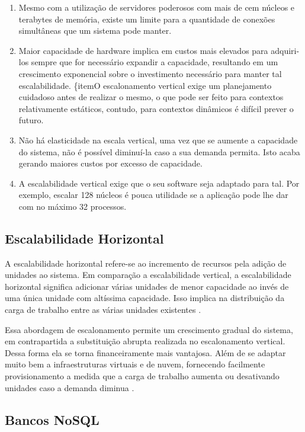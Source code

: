 \begin{enumerate}
    \item{Mesmo com a utilização de servidores poderosos com mais de cem núcleos
    e terabytes de memória, existe um limite para a quantidade de conexões
    simultâneas que um sistema pode manter.}
    \item{Maior capacidade de hardware implica em custos mais elevados para
    adquiri-los sempre que for necessário expandir a capacidade, resultando em
    um crescimento exponencial sobre o investimento necessário para manter tal
    escalabilidade.}
    \{item{O escalonamento vertical exige um planejamento cuidadoso antes de
    realizar o mesmo, o que pode ser feito para contextos relativamente estáticos,
    contudo, para contextos dinâmicos é difícil prever o futuro.}
    \item{Não há elasticidade na escala vertical, uma vez que se aumente a
    capacidade do sistema, não é possível diminuí-la caso a sua demanda permita.
    Isto acaba gerando maiores custos por excesso de capacidade.}
    \item{A escalabilidade vertical exige que o seu software seja adaptado para
    tal. Por exemplo, escalar 128 núcleos é pouca utilidade se a aplicação pode
    lhe dar com no máximo 32 processos.}
\end{enumerate}

\subsection{Escalabilidade Horizontal}

A escalabilidade horizontal refere-se ao incremento de recursos pela adição
de unidades ao sistema. Em comparação a escalabilidade vertical, a escalabilidade
horizontal significa adicionar várias unidades de menor capacidade ao invés de
uma única unidade com altíssima capacidade. Isso implica na distribuição da carga
de trabalho entre as várias unidades existentes \cite{FreshGuide2012}.

Essa abordagem de escalonamento permite um crescimento gradual do sistema, em
contrapartida a substituição abrupta realizada no escalonamento vertical. Dessa
forma ela se torna financeiramente mais vantajosa. Além de se adaptar muito bem
a infraestruturas virtuais e de nuvem, fornecendo facilmente provisionamento
a medida que a carga de trabalho aumenta ou desativando unidades caso a demanda
diminua \cite{InterSystems2019}.

\subsection{Bancos NoSQL}

